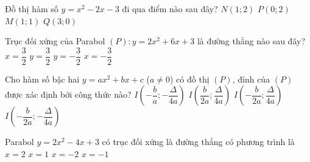 

\begin{ex}%
	Đồ thị hàm số $y=x^2-2  x-3$ đi qua điểm nào sau đây?
	\choice 
		 {$N(1; 2)$ }
		{$P(0; 2)$} 
		{$M(1;  1)$ }
		{\True $Q(3;  0)$}
\end{ex}

\begin{ex}%
	Trục đối xứng của Parabol $(P)\colon y=2x^2+6x+3$ là đường thẳng nào sau đây? 
	\choice 
		 {$x=\dfrac{3}{2} $}
		 {$y=\dfrac{3}{2} $}
		 {$y=-\dfrac{3}{2} $}
		 {\True $x=-\dfrac{3}{2} $}
\end{ex}

\begin{ex}%
	Cho hàm số bậc hai $y=ax^2+bx+c$  ($a \neq 0$) có đồ thị $(P)$, đỉnh của $(P)$ được xác định bởi công thức nào?
	 \choice
		{$I\left(-\dfrac{b}{a}; -\dfrac{\Delta}{4a}\right)$} 
		{$I\left(\dfrac{b}{2a}; \dfrac{\Delta}{4a}\right)$} 
		{$I\left(-\dfrac{b}{2a};  \dfrac{\Delta}{4a}\right)$}
		{\True $I\left(-\dfrac{b}{2a};-\dfrac{\Delta}{4a}\right)$} 
\end{ex}

\begin{ex}%
	Parabol $y=2x^2-4x+3$ có trục đối xứng là đường thẳng có phương trình là 
	\choice 
		 {$x=2$}
		 {\True $x=1$}
		{$x=-2$} 
		{$x=-1$} 
\end{ex}

